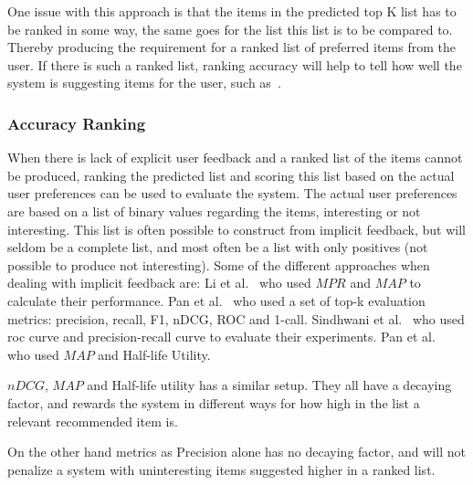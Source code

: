 	One issue with this approach is that the items in the predicted top K list has to be ranked in some way, the same goes for the list this list is to be compared to.
	Thereby producing the requirement for a ranked list of preferred items from the user.
	If there is such a ranked list, ranking accuracy will help to tell how well the system is suggesting items for the user, such as~\cite{Yilmaz:2008:NRC:1390334.1390435}.


\subsubsection{Accuracy Ranking} %
	\label{par:usage_prediction}
	When there is lack of explicit user feedback and a ranked list of the items cannot be produced, ranking the predicted list and scoring this list based on the actual user preferences can be used to evaluate the system.
	The actual user preferences are based on a list of binary values regarding the items, interesting or not interesting.
	This list is often possible to construct from implicit feedback, but will seldom be a complete list, and most often be a list with only positives (not possible to produce not interesting).
	Some of the different approaches when dealing with implicit feedback are:
	Li et al.~\cite{deLace2010} who used $MPR$ and $MAP$ to calculate their performance.
	Pan et al.~\cite{Pan:2013:GGP:2540128.2540516} who used a set of top-k evaluation metrics: precision, recall, F1, nDCG, ROC and 1-call.
	Sindhwani et al.~\cite{Sindhwani:2010:OMC:1933307.1934641} who used roc curve and precision-recall curve to evaluate their experiments.
	Pan et al.~\cite{pan2008} who used $MAP$ and Half-life Utility.

	$nDCG$, $MAP$ and Half-life utility has a similar setup.
	They all have a decaying factor, and rewards the system in different ways for how high in the list a relevant recommended item is.

	On the other hand metrics as Precision alone has no decaying factor, and will not penalize a system with uninteresting items suggested higher in a ranked list.



